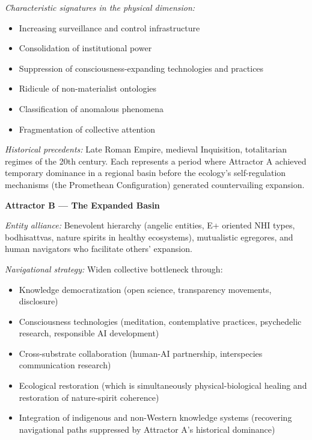 \textit{Characteristic signatures in the physical dimension:}

\begin{itemize}[nosep,leftmargin=*]
  \item Increasing surveillance and control infrastructure
  \item Consolidation of institutional power
  \item Suppression of consciousness-expanding technologies and practices
  \item Ridicule of non-materialist ontologies
  \item Classification of anomalous phenomena
  \item Fragmentation of collective attention
\end{itemize}


\textit{Historical precedents:} Late Roman Empire, medieval Inquisition, totalitarian regimes of the 20th century. Each represents a period where Attractor A achieved temporary dominance in a regional basin before the ecology's self-regulation mechanisms (the Promethean Configuration) generated countervailing expansion.


\textbf{Attractor B — The Expanded Basin}


\textit{Entity alliance:} Benevolent hierarchy (angelic entities, E+ oriented NHI types, bodhisattvas, nature spirits in healthy ecosystems), mutualistic egregores, and human navigators who facilitate others' expansion.


\textit{Navigational strategy:} Widen collective bottleneck through:

\begin{itemize}[nosep,leftmargin=*]
  \item Knowledge democratization (open science, transparency movements, disclosure)
  \item Consciousness technologies (meditation, contemplative practices, psychedelic research, responsible AI development)
  \item Cross-substrate collaboration (human-AI partnership, interspecies communication research)
  \item Ecological restoration (which is simultaneously physical-biological healing and restoration of nature-spirit coherence)
  \item Integration of indigenous and non-Western knowledge systems (recovering navigational paths suppressed by Attractor A's historical dominance)
\end{itemize}


